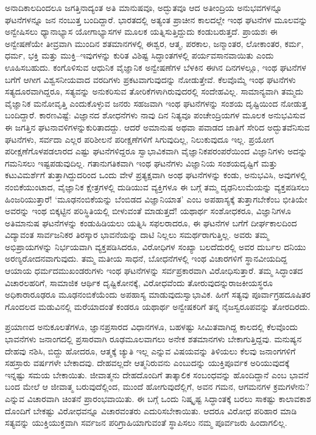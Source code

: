 
ಅನಾದಿಕಾಲದಿಂದಲೂ ಜಗತ್ತಿನಾದ್ಯಂತ ಅತಿ ಮಾನುಷವೂ, ಅದ್ಭುತವೂ ಆದ ಅತೀಂದ್ರಿಯ ಅನುಭವಗಳನ್ನೂ ಘಟನೆಗಳನ್ನೂ ಜನ ನಂಬುತ್ತ ಬಂದಿದ್ದಾರೆ. ಭಾರತದಲ್ಲಿ ಅತ್ಯಂತ ಪ್ರಾಚೀನ ಕಾಲದಲ್ಲೇ ಇಂಥ ಘಟನೆಗಳ ಮೂಲವನ್ನು ಅನ್ವೇಷಿಸಲು ಧ್ಯಾನಾಭ್ಯಾಸ ಯೋಗಾಭ್ಯಾಸಗಳ ಮೂಲಕ ಯತ್ನಿಸುತ್ತಿದ್ದುದು ಕಂಡುಬರುತ್ತದೆ. ಪ್ರಾಯಶಃ ಈ ಅನ್ವೇಷಣೆಯೇ ತೀವ್ರವಾಗಿ ಮುಂದಿನ ಶತಮಾನಗಳಲ್ಲಿ ಈಶ್ವರ, ಆತ್ಮ, ಪರಕಾಲ, ಜನ್ಮಾಂತರ, ಲೋಕಾಂತರ, ಕರ್ಮ, ಧರ್ಮ, ಭಕ್ತಿ ಮತ್ತು ಮುಕ್ತಿ–ಇವುಗಳನ್ನು ಕುರಿತ ವಿಶಿಷ್ಟ ಸಿದ್ಧಾಂತಗಳಲ್ಲಿ ಪರ್ಯವಸಾನ\-\break ವಾಯಿತು ಎಂದು ಊಹಿಸಬಹುದು. ಕಂಗೊಳಿಸುವ ಆಧುನಿಕ ವೈಜ್ಞಾನಿಕ ಅನ್ವೇಷಣೆಗಳ ಬೆಳಕಿನ ಈಗಿನ ದಿನಗಳಲ್ಲೂ, ಇಂಥ ಘಟನೆಗಳ ಬಗೆಗೆ ಆಗೀಗ ವಿಶ್ವಸನೀಯವಾದ ವರದಿಗಳು ಪ್ರಕಟವಾಗುವುದನ್ನು ನೋಡುತ್ತೇವೆ. ಕೆಲವೊಮ್ಮೆ ಇಂಥ ಘಟನೆಗಳು ಸತ್ಯದೂರವಾಗಿದ್ದರೂ, ಸತ್ಯವನ್ನು ಅನುಕರಿಸುವ ತೋರಿಕೆಗಳಾಗಿರುವುದರಲ್ಲಿ ಸಂದೇಹವಿಲ್ಲ. ಸಾಮಾನ್ಯವಾಗಿ ತಮ್ಮದು ವೈಜ್ಞಾನಿಕ ಮನೋವೃತ್ತಿ ಎಂದುಕೊಳ್ಳುವ ಜನರು ಸಹಜವಾಗಿ ಇಂಥ ಘಟನೆಗಳನ್ನು ಸಂಶಯ ದೃಷ್ಟಿಯಿಂದ ನೋಡುತ್ತ ಬಂದಿದ್ದಾರೆ. ಕಾರಣವಿಷ್ಟೆ: ವಿಜ್ಞಾನದ ಶೋಧನೆಗಳು ನಾವು ದಿನ ನಿತ್ಯವೂ ಪಂಚೇಂದ್ರಿಯಗಳ ಮೂಲಕ ಅನುಭವಿಸುವ ಈ ಜಗತ್ತಿನ ಘಟನಾವಳಿಗಳನ್ನು\break ಕುರಿತಾದದ್ದು. ಆದರೆ ಅಮಾನುಷ ಅಥವಾ ಪವಾಡದ ಜಾತಿಗೆ ಸೇರಿದ ಅದ್ಭುತವೆನಿಸುವ ಘಟನೆಗಳು, ಸರ್ವದಾ ಎಲ್ಲರ ಪರಿಶೀಲನೆ ಪರೀಕ್ಷಣೆಗಳಿಗೆ ಸಿಗುವುದಿಲ್ಲ, ನಿಲುಕುವುದೂ ಇಲ್ಲ. ಪ್ರಯೋಗ ಪರೀಕ್ಷಣೆ\-ಗೊಳ\-ಪಡಲಾರದ ಎಷ್ಟು ಘಟನೆಗಳಿದ್ದರೂ ಸ್ವಾಭಾವಿಕವಾಗಿ ವೈಜ್ಞಾನಿಕ\break ಪರಂಪರೆಯಿಂದ ವಿಜ್ಞಾನಿಗಳು ಅದನ್ನು ಗಮನಿಸಲು ಇಷ್ಟಪಡುವುದಿಲ್ಲ. ಗತಾನುಗತಿಕವಾಗಿ ಇಂಥ ಘಟನೆಗಳು ವಿಜ್ಞಾನಿಯ ಸಂಶಯದೃಷ್ಟಿಗೆ ಮತ್ತು ಕಟುವಿಮರ್ಶೆಗೆ ತುತ್ತಾಗಿದ್ದುದರಿಂದ ಒಂದು ವೇಳೆ ಪ್ರತ್ಯಕ್ಷವಾಗಿ ಅಂಥ ಘಟನೆಗಳನ್ನು ಕಂಡು, ಅನುಭವಿಸಿ, ಅವುಗಳಲ್ಲಿ ನಂಬಿಕೆ\-ಯುಂಟಾದ, ವೈಜ್ಞಾನಿಕ ಕ್ಷೇತ್ರಗಳಲ್ಲಿ ದುಡಿಯುವ ವ್ಯಕ್ತಿಗಳೂ ಈ ಬಗ್ಗೆ ತಮ್ಮ ದೃಢನಿಲುಮೆಯನ್ನು ವ್ಯಕ್ತಪಡಿಸಲು ಹಿಂಜರಿಯುತ್ತಾರೆ! ‘ಮೂಢನಂಬಿಕೆಯನ್ನು ಬೆಂಬಿಡದ ವಿಜ್ಞಾನಿಯಾತ’ ಎಂಬ ಅಪಹಾಸ್ಯಕ್ಕೆ ತುತ್ತಾಗಬೇಕೆಂಬ ಭೀತಿಯೇ ಅವರನ್ನು ಇಂಥ ಬಿಕ್ಕಟ್ಟಿನ ಪರಿಸ್ಥಿತಿಯಲ್ಲಿ ಬೀಳುವಂತೆ ಮಾಡುತ್ತದೆ! ಯಥಾರ್ಥ ಸಂಶೋಧಕರೂ, ವಿಜ್ಞಾನಿಗಳೂ ಅತಿಮಾನುಷ ಘಟನೆಗಳನ್ನು ಕಂಡುಹಿಡಿಯಲು ಯತ್ನಿಸಿ ಸಫಲರಾದರೂ, ಈ ಘಟನೆಗಳ ಬಗೆಗೆ ದೀರ್ಘಕಾಲದಿಂದ ವಿದ್ಯಾವಂತ ಸಾರ್ವಜನಿಕರ ತಿರಸ್ಕಾರ ಭಾವನೆಯನ್ನು ದಾಟಿ ನಿಲ್ಲಲು ಸಮರ್ಥರಾಗುತ್ತಿಲ್ಲ. ಅವರು ತಮ್ಮ ಅಭಿಪ್ರಾಯಗಳನ್ನು ನಿರ್ಭಯವಾಗಿ ವ್ಯಕ್ತಪಡಿಸಿದರೂ, ವಿರೋಧಿಗಳ ಸಂಖ್ಯಾ ಬಲದೆದುರಲ್ಲಿ ಅವರ ದುರ್ಬಲ ದನಿಯು ಅರಣ್ಯರೋದನವಾಗುವುದು. ತಮ್ಮ ಮತೀಯ ಸಾಧನೆ, ಬೋಧನೆಗಳಲ್ಲಿ ಇಂಥ ವಿಚಾರಗಳಿಗೆ ಸ್ಥಾನವೀಯದಿದ್ದ ಆಯಾಯ ಧರ್ಮದ\break ಮುಖಂಡರುಗಳು ಇಂಥ ಘಟನೆಗಳನ್ನು ಸರ್ವಪ್ರಕಾರವಾಗಿ ವಿರೋಧಿಸುತ್ತಾರೆ. ತಮ್ಮ ಸಿದ್ಧಾಂತದ ವಿಚಾರಲಹರಿಗೆ, ಸಾಮಾಜಿಕ ಆರ್ಥಿಕ ದೃಷ್ಟಿಕೋನಕ್ಕೆ, ವಿರೋಧವೆಂದು ತೋರುವುದನ್ನು\break ರಾಜಕೀಯಸ್ಥರೂ ಅಧಿಕಾರಾರೂಢರೂ ಮೂಢನಂಬಿಕೆಯೆಂದು ಅಪಹಾಸ್ಯ ಮಾಡುವುದು\break ಸ್ವಾಭಾ\-ವಿಕ. ಹೀಗೆ ಸತ್ಯವು ಪೂರ್ವಾಗ್ರಹದೂಷಿತರ ಗೊಂದಲದ ಮಡುವಿನಲ್ಲಿ ಮರೆಯಾದಂತೆ ಕಂಡರೂ ಯಥಾರ್ಥ ಅನ್ವೇಷಕರಿಗೆ ತನ್ನ ನೈಜಸ್ವರೂಪವನ್ನು ತೋರದಿರದು.

ಪ್ರಯಾಣದ ಅನುಕೂಲತೆಗಳೂ, ಜ್ಞಾನಪ್ರಸಾರದ ವಿಧಾನಗಳೂ, ಬಹಳಷ್ಟು ಸೀಮಿತವಾಗಿದ್ದ ಕಾಲದಲ್ಲಿ ಕೆಲವೊಂದು ಭಾವನೆಗಳು ಜನಾಂಗದಲ್ಲಿ ಪ್ರಸಾರವಾಗಿ ರೂಢಮೂಲವಾಗಲು ಅನೇಕ ಶತಮಾನಗಳು ಬೇಕಾಗುತ್ತಿದ್ದವು. ಮನುಷ್ಯನ ದೇಹವು ನಶಿಸಿ, ಬಿದ್ದು ಹೋದರೂ, ಆತ್ಮಕ್ಕೆ ಚ್ಯುತಿ ಇಲ್ಲ ಎನ್ನುವ ವಿಷಯವನ್ನು ತಿಳಿಯಲು ಕೆಲವು ಜನಾಂಗಗಳಿಗೆ ಸಹಸ್ರಾರು ವರ್ಷಗಳೇ ಬೇಕಾದವು. ದೇಹವಲ್ಲದೇ ಆತ್ಮನಿರುವನು ಎಂಬುದನ್ನು ಯುಕ್ತಿಪೂರ್ವಕ ಅರಿಯುವುದಕ್ಕೆ ಇನ್ನಷ್ಟು ಸಮಯ ಬೇಕಾಯಿತು. ಜೀವಾತ್ಮನು ದೇಹದೊಂದಿಗೆ ತಾತ್ಕಾಲಿಕ ಸಂಬಂಧವನ್ನು ಹೊಂದಿದ್ದಾನೆ ಎಂಬ ಭಾವನೆ ಬಂದ ಮೇಲೆ ಆ ಜೀವಾತ್ಮ ಬರುವುದೆಲ್ಲಿಂದ, ಮುಂದೆ ಹೋಗುವುದೆಲ್ಲಿಗೆ, ಅವನ ಗಮನ, ಆಗಮನಗಳ ಕ್ರಮಗಳೇನು? ಎನ್ನುವ ವಿಚಾರವಾಗಿ ಚಿಂತನೆ ಪ್ರಾರಂಭವಾಯಿತು. ಈ ಬಗ್ಗೆ ಒಂದು ನಿಷ್ಕೃಷ್ಟ ಸಿದ್ಧಾಂತಕ್ಕೆ ಬರಲು ಸಾಕಷ್ಟು ಕಾಲಾವಕಾಶ ದೊಂದಿಗೆ ಬೇಕಷ್ಟು ವಿರೋಧವನ್ನೂ ವಿಚಾರವಂತರು ಎದುರಿಸಬೇಕಾಯಿತು. ಆದರೂ ವಿರೋಧ ಪರಿಹಾರ ಮಾಡಿ ಸತ್ಯವನ್ನು ಯುಕ್ತಿಯುಕ್ತವಾಗಿ ಸರ್ವಜನ ಪರಿಗ್ರಾಹಿಯಾಗುವಂತೆ ಸ್ಥಾಪಿಸಲು ನಮ್ಮ ಪೂರ್ವಜರು ಹಿಂದಾಗಲಿಲ್ಲ.

